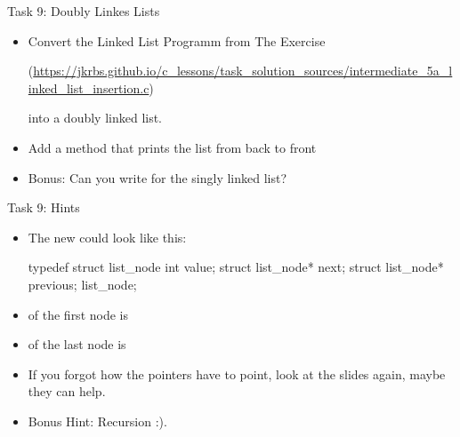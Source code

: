 \documentclass[10pt,graphics,aspectratio=169,table]{beamer}
\begin{document}
\begin{frame}[fragile]{Task 9: Doubly Linkes Lists}

    \begin{itemize}
        \item Convert the Linked List Programm from The Exercise
        
        \small
        (\url{https://jkrbs.github.io/c_lessons/task_solution_sources/intermediate_5a_linked_list_insertion.c})
        
        into a doubly linked list. 
        
        

        \item Add a  method that prints the list from back to front
        \item Bonus: Can you write  for the singly linked list?
    \end{itemize}

\end{frame}

\begin{frame}[fragile]{Task 9: Hints}
    \begin{itemize}
        \item The new  could look like this:
            \begin{codeblock}
typedef struct list_node {
    int value;    
    struct list_node* next;
    struct list_node* previous;
} list_node;
            \end{codeblock}

        \item {} of the first node is 
        \item {} of the last node is  
        \item If you forgot how the pointers have to point, 
              look at the slides again, maybe they can help.
        
        \item Bonus Hint: Recursion :).
\end{itemize}
   
    
\end{frame}
\end{document}
